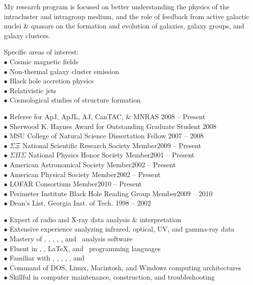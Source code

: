 \documentclass[11pt]{cv}
\newcommand{\myhead}{Cavagnolo, Curriculum Vitae}
\begin{document}
\begin{llist}
My research program is focused on better understanding the physics of
the intracluster and intragroup medium, and the role of feedback from
active galactic nuclei \& quasars on the formation and evolution of
galaxies, galaxy groups, and galaxy clusters.

Specific areas of interest:\\
$\bullet$ Cosmic magnetic fields\\
$\bullet$ Non-thermal galaxy cluster emission\\
$\bullet$ Black hole accretion physics\\
$\bullet$ Relativistic jets\\
$\bullet$ Cosmological studies of structure formation


$\bullet$ Referee for ApJ, ApJL, AJ, CanTAC, \& MNRAS \hfill 2008 -- Present\\
$\bullet$ Sherwood K. Haynes Award for Outstanding Graduate Student \hfill 2008\\
$\bullet$ MSU College of Natural Science Dissertation Fellow \hfill 2007 -- 2008\\
$\bullet$ $\Sigma \Xi$ National Scientific Research Society Member\hfill 2009 -- Present\\
$\bullet$ $\Sigma \Pi \Sigma$ National Physics Honor Society Member\hfill 2001 -- Present\\
$\bullet$ American Astronomical Society Member\hfill 2002 -- Present\\
$\bullet$ American Physical Society Member\hfill 2002 -- Present\\
$\bullet$ LOFAR Consortium Member\hfill 2010 -- Present\\
$\bullet$ Perimeter Institute Black Hole Reading Group Member\hfill 2009 -- 2010\\
$\bullet$ Dean's List, Georgia Inst. of Tech. \hfill 1998 -- 2002


$\bullet$ Expert of radio and X-ray data analysis \& interpretation\\
$\bullet$ Extensive experience analyzing infrared, optical, UV, and gamma-ray data\\
$\bullet$ Mastery of \aips, \casa, \ciao, \iraf, \osa, and \sas\ analysis software\\
$\bullet$ Fluent in \html, \idl, \LaTeX, and \perl\ programming languages\\
$\bullet$ Familiar with \clang, \fortran, \mysql, \python, \supmo, and \tickle\\
$\bullet$ Command of DOS, Linux, Macintosh, and Windows computing architectures\\
$\bullet$ Skillful in computer maintenance, construction, and troubleshooting
\markright{\myhead}


\end{llist}
\end{document}
